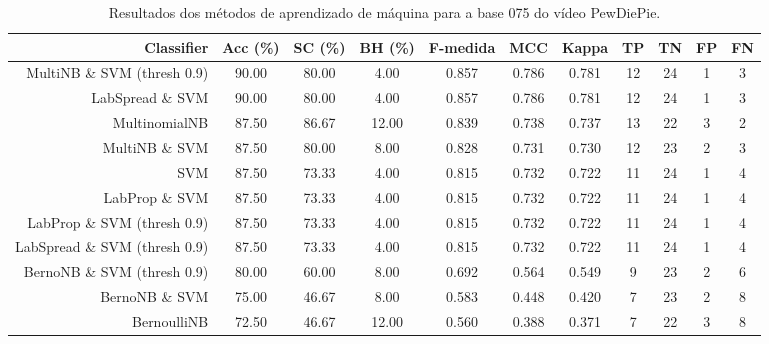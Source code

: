 \begin{table}[!htb]
\centering
\caption{Resultados dos métodos de aprendizado de máquina para a base 075 do vídeo PewDiePie.}
\label{tab:PewDiePie-075}
\begin{tabular}{r|c|c|c|c|c|c|c|c|c|c}
\hline\hline
Classifier & Acc (\%) & SC (\%) & BH (\%) & F-medida & MCC & Kappa & TP & TN & FP & FN \\ \hline
MultiNB \& SVM (thresh 0.9) & 90.00 & 80.00 & 4.00 & 0.857 & 0.786 & 0.781 & 12 & 24 & 1 & 3 \\ 
LabSpread \& SVM & 90.00 & 80.00 & 4.00 & 0.857 & 0.786 & 0.781 & 12 & 24 & 1 & 3 \\ 
MultinomialNB & 87.50 & 86.67 & 12.00 & 0.839 & 0.738 & 0.737 & 13 & 22 & 3 & 2 \\ 
MultiNB \& SVM & 87.50 & 80.00 & 8.00 & 0.828 & 0.731 & 0.730 & 12 & 23 & 2 & 3 \\ 
SVM & 87.50 & 73.33 & 4.00 & 0.815 & 0.732 & 0.722 & 11 & 24 & 1 & 4 \\ 
LabProp \& SVM & 87.50 & 73.33 & 4.00 & 0.815 & 0.732 & 0.722 & 11 & 24 & 1 & 4 \\ 
LabProp \& SVM (thresh 0.9) & 87.50 & 73.33 & 4.00 & 0.815 & 0.732 & 0.722 & 11 & 24 & 1 & 4 \\ 
LabSpread \& SVM (thresh 0.9) & 87.50 & 73.33 & 4.00 & 0.815 & 0.732 & 0.722 & 11 & 24 & 1 & 4 \\ 
BernoNB \& SVM (thresh 0.9) & 80.00 & 60.00 & 8.00 & 0.692 & 0.564 & 0.549 & 9 & 23 & 2 & 6 \\ 
BernoNB \& SVM & 75.00 & 46.67 & 8.00 & 0.583 & 0.448 & 0.420 & 7 & 23 & 2 & 8 \\ 
BernoulliNB & 72.50 & 46.67 & 12.00 & 0.560 & 0.388 & 0.371 & 7 & 22 & 3 & 8 \\ 
\hline\hline
\end{tabular}
\end{table}
